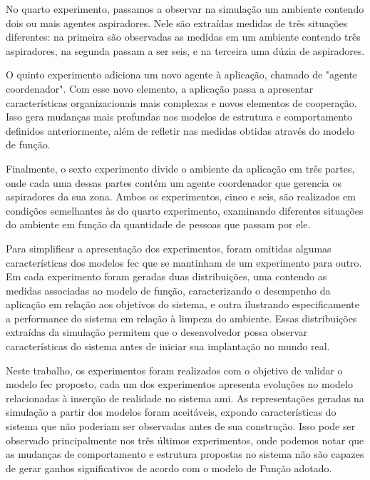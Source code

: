 No quarto experimento, passamos a observar na simulação um ambiente contendo dois ou mais agentes aspiradores. Nele são extraídas medidas de três situações diferentes: na primeira são observadas as medidas em um ambiente contendo três aspiradores, na segunda passam a ser seis, e na terceira uma dúzia de aspiradores. 

O quinto experimento adiciona um novo agente à aplicação, chamado de "agente coordenador". Com esse novo elemento, a aplicação passa a apresentar características organizacionais mais complexas e novos elementos de cooperação. Isso gera mudanças mais profundas nos modelos de estrutura e comportamento definidos anteriormente, além de refletir nas medidas obtidas através do modelo de função.

Finalmente, o sexto experimento divide o ambiente da aplicação em três partes, onde cada uma dessas partes contém um agente coordenador que gerencia os aspiradores da sua zona. Ambos os experimentos, cinco e seis, são realizados em condições semelhantes às do quarto experimento, examinando diferentes situações do ambiente em função da quantidade de pessoas que passam por ele. 

Para simplificar a apresentação dos experimentos, foram omitidas algumas características dos modelos \acrshort{fec} que se mantinham de um experimento para outro. Em cada experimento foram geradas duas distribuições, uma contendo as medidas associadas ao modelo de função, caracterizando o desempenho da aplicação em relação aos objetivos do sistema, e outra ilustrando especificamente a performance do sistema em relação à limpeza do ambiente. Essas distribuições extraídas da simulação permitem que o desenvolvedor possa observar características do sistema antes de iniciar sua implantação no mundo real.

Neste trabalho, os experimentos foram realizados com o objetivo de validar o modelo \acrshort{fec} proposto, cada um dos experimentos apresenta evoluções no modelo relacionadas à inserção de realidade no sistema \acrshort{ami}. As representações geradas na simulação a partir dos modelos foram aceitáveis, expondo características do sistema que não poderiam ser observadas antes de sua construção. Isso pode ser observado principalmente nos três últimos experimentos, onde podemos notar que as mudanças de comportamento e estrutura propostas no sistema não são capazes de gerar ganhos significativos de acordo com o modelo de Função adotado.



